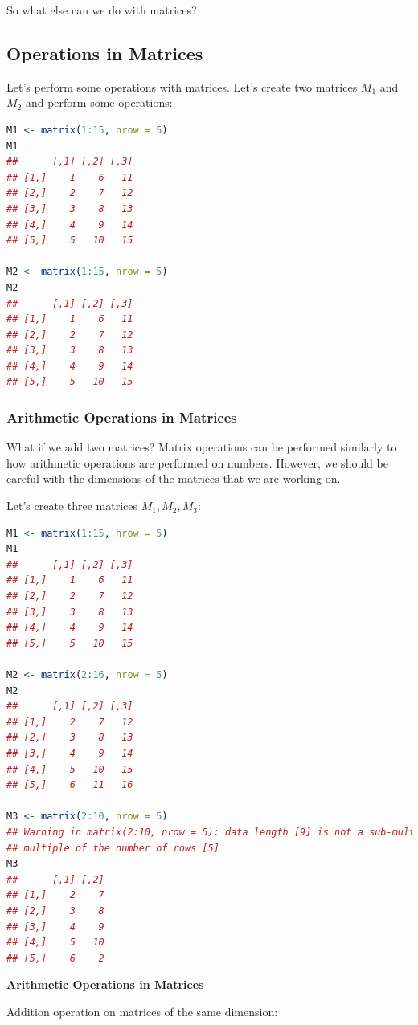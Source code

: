 \documentclass[10pt]{book}
\begin{document}
So what else can we do with matrices?

\subsection{Operations in Matrices}

Let’s perform some operations with matrices. Let’s create two matrices \( M_1 \) and \( M_2 \) and perform some operations:

\begin{lstlisting}[language=R]
M1 <- matrix(1:15, nrow = 5)
M1
##      [,1] [,2] [,3]
## [1,]    1    6   11
## [2,]    2    7   12
## [3,]    3    8   13
## [4,]    4    9   14
## [5,]    5   10   15

M2 <- matrix(1:15, nrow = 5)
M2
##      [,1] [,2] [,3]
## [1,]    1    6   11
## [2,]    2    7   12
## [3,]    3    8   13
## [4,]    4    9   14
## [5,]    5   10   15
\end{lstlisting}

\subsubsection{Arithmetic Operations in Matrices}

What if we add two matrices? Matrix operations can be performed similarly to how arithmetic operations are performed on numbers. However, we should be careful with the dimensions of the matrices that we are working on.

Let’s create three matrices \( M_1, M_2, M_3 \):

\begin{lstlisting}[language=R]
M1 <- matrix(1:15, nrow = 5)
M1
##      [,1] [,2] [,3]
## [1,]    1    6   11
## [2,]    2    7   12
## [3,]    3    8   13
## [4,]    4    9   14
## [5,]    5   10   15

M2 <- matrix(2:16, nrow = 5)
M2
##      [,1] [,2] [,3]
## [1,]    2    7   12
## [2,]    3    8   13
## [3,]    4    9   14
## [4,]    5   10   15
## [5,]    6   11   16

M3 <- matrix(2:10, nrow = 5)
## Warning in matrix(2:10, nrow = 5): data length [9] is not a sub-multiple or
## multiple of the number of rows [5]
M3
##      [,1] [,2]
## [1,]    2    7
## [2,]    3    8
## [3,]    4    9
## [4,]    5   10
## [5,]    6    2
\end{lstlisting}

\textbf{Arithmetic Operations in Matrices}

Addition operation on matrices of the same dimension:
\end{document}
